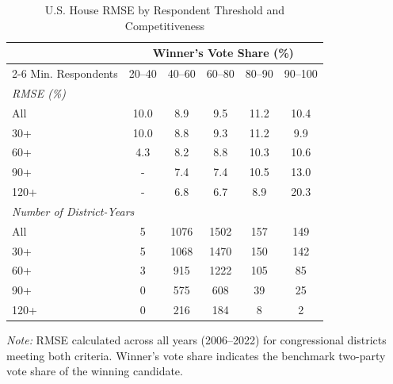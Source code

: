 \begin{table}[!htbp]
\centering
\footnotesize
\caption{U.S. House RMSE by Respondent Threshold and Competitiveness}
\label{tab:us_house_rmse_grid}
\begin{threeparttable}
\begin{tabular}{lccccc}
\toprule
& \multicolumn{5}{c}{Winner's Vote Share (\%)} \\
\cmidrule(lr){2-6}
Min. Respondents & 20--40 & 40--60 & 60--80 & 80--90 & 90--100 \\
\midrule
\multicolumn{6}{l}{\textit{RMSE (\%)}} \\
\addlinespace[0.2em]
All & 10.0 & 8.9 & 9.5 & 11.2 & 10.4 \\
30+ & 10.0 & 8.8 & 9.3 & 11.2 & 9.9 \\
60+ & 4.3 & 8.2 & 8.8 & 10.3 & 10.6 \\
90+ & - & 7.4 & 7.4 & 10.5 & 13.0 \\
120+ & - & 6.8 & 6.7 & 8.9 & 20.3 \\
\midrule
\multicolumn{6}{l}{\textit{Number of District-Years}} \\
\addlinespace[0.2em]
All & 5 & 1076 & 1502 & 157 & 149 \\
30+ & 5 & 1068 & 1470 & 150 & 142 \\
60+ & 3 & 915 & 1222 & 105 & 85 \\
90+ & 0 & 575 & 608 & 39 & 25 \\
120+ & 0 & 216 & 184 & 8 & 2 \\
\bottomrule
\end{tabular}
\begin{tablenotes}
\footnotesize
\item \textit{Note:} RMSE calculated across all years (2006--2022) for congressional districts meeting both criteria. Winner's vote share indicates the benchmark two-party vote share of the winning candidate.
\end{tablenotes}
\end{threeparttable}
\end{table}
